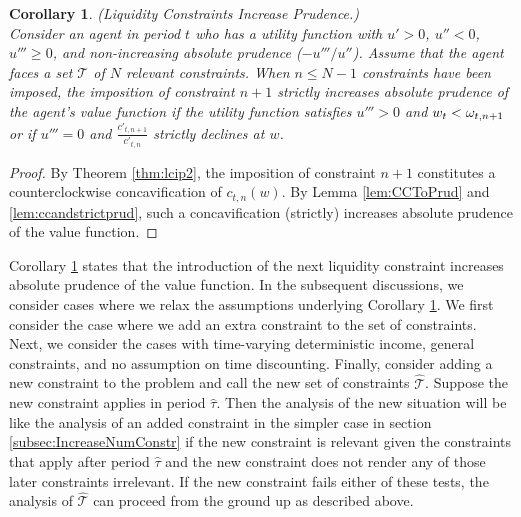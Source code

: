 \documentclass[titlepage]{\econtex}
\newcommand{\ifVerbatimWrite}{\ifthenelse{\boolean{verbatimwriteOn}}} %
\renewenvironment{verbatimwrite}[1]{} %
\providecommand{\wAlt}{\omega}
\newtheorem{corollary}{Corollary}
\begin{document}
\begin{verbatimwrite}{Sections/LCandCC}
  \begin{corollary}\label{cor:lcip} (Liquidity Constraints Increase Prudence.) \\
    Consider an agent in period $t$ who has a utility function with $u' > 0$, $u'' < 0$, $u''' \geq 0$, and non-increasing absolute prudence ($-u'''/u''$). Assume that the agent faces a set $\mathcal{T}$ of $N$ relevant constraints. When $n \leq N-1$ constraints have been imposed, the imposition of constraint $n+1$ strictly increases absolute prudence of the agent's value function if the utility function satisfies $u''' > 0$ and $w_t < \wAlt_{t,n+1}$ or if $u''' = 0$ and $\frac{c'_{t,n+1}}{c'_{t,n}}$ strictly declines at $w$.
  \end{corollary}
  \begin{proof}
    By Theorem \ref{thm:lcip2}, the imposition of constraint $n+1$ constitutes a counterclockwise concavification of $c_{t,n}(w)$. By Lemma \ref{lem:CCToPrud} and \ref{lem:ccandstrictprud}, such a concavification (strictly) increases absolute prudence of the value function.
  \end{proof}
  \noindent Corollary \ref{cor:lcip} states that the introduction of the next liquidity constraint increases absolute prudence of the value function. In the subsequent discussions, we consider cases where we relax the assumptions underlying Corollary \ref{cor:lcip}. We first consider the case where we add an extra constraint to the set of constraints. Next, we consider the cases with time-varying deterministic income, general constraints, and no assumption on time discounting.
  Finally, consider adding a new constraint to the problem and call the new set of constraints $\hat{\mathcal{T}}$.  Suppose the new constraint applies in period $\hat{\tau}$.  Then the analysis of the new situation will be like the analysis of an added constraint in the simpler case in section \ref{subsec:IncreaseNumConstr} if the new constraint is relevant given the constraints that apply after period $\hat{\tau}$ and the new constraint does not render any of those later constraints irrelevant. If the new constraint fails either of these tests, the analysis of $\hat{\mathcal{T}}$ can proceed from the ground up as described above.
\end{verbatimwrite}\ifVerbatimWrite{}{} %
\end{document}
